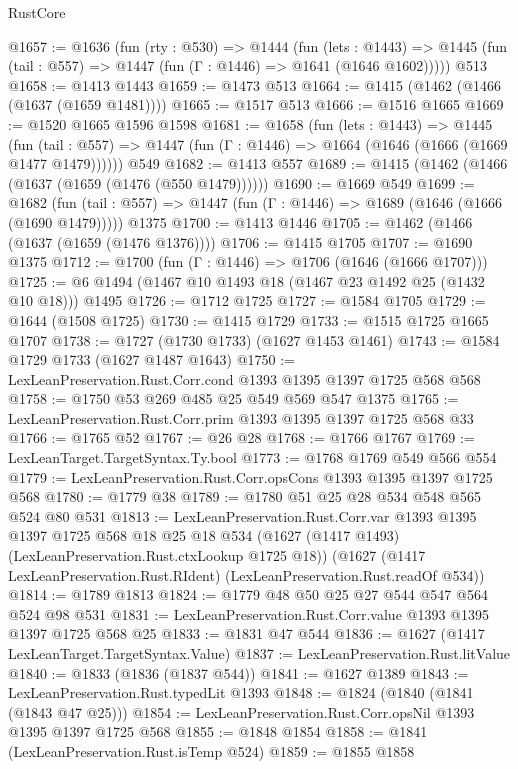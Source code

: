 \begin{lexlean}{RustCore}
\begin{coremodule}
@1657 := @1636
    (fun (rty : @530) =>
    @1444
      (fun (lets : @1443) =>
      @1445 (fun (tail : @557) => @1447 (fun (Γ : @1446) => @1641 (@1646 @1602)))))
    @513
@1658 := @1413 @1443
@1659 := @1473 @513
@1664 := @1415 (@1462 (@1466 (@1637 (@1659 @1481))))
@1665 := @1517 @513
@1666 := @1516 @1665
@1669 := @1520 @1665 @1596 @1598
@1681 := @1658
    (fun (lets : @1443) =>
    @1445
      (fun (tail : @557) => @1447 (fun (Γ : @1446) => @1664 (@1646 (@1666 (@1669 @1477 @1479))))))
    @549
@1682 := @1413 @557
@1689 := @1415 (@1462 (@1466 (@1637 (@1659 (@1476 (@550 @1479))))))
@1690 := @1669 @549
@1699 := @1682
    (fun (tail : @557) => @1447 (fun (Γ : @1446) => @1689 (@1646 (@1666 (@1690 @1479)))))
    @1375
@1700 := @1413 @1446
@1705 := @1462 (@1466 (@1637 (@1659 (@1476 @1376))))
@1706 := @1415 @1705
@1707 := @1690 @1375
@1712 := @1700 (fun (Γ : @1446) => @1706 (@1646 (@1666 @1707)))
@1725 := @6 @1494 (@1467 @10 @1493 @18 (@1467 @23 @1492 @25 (@1432 @10 @18))) @1495
@1726 := @1712 @1725
@1727 := @1584 @1705
@1729 := @1644 (@1508 @1725)
@1730 := @1415 @1729
@1733 := @1515 @1725 @1665 @1707
@1738 := @1727 (@1730 @1733) (@1627 @1453 @1461)
@1743 := @1584 @1729 @1733 (@1627 @1487 @1643)
@1750 := LexLeanPreservation.Rust.Corr.cond @1393 @1395 @1397 @1725 @568 @568
@1758 := @1750 @53 @269 @485 @25 @549 @569 @547 @1375
@1765 := LexLeanPreservation.Rust.Corr.prim @1393 @1395 @1397 @1725 @568 @33
@1766 := @1765 @52
@1767 := @26 @28
@1768 := @1766 @1767
@1769 := LexLeanTarget.TargetSyntax.Ty.bool
@1773 := @1768 @1769 @549 @566 @554
@1779 := LexLeanPreservation.Rust.Corr.opsCons @1393 @1395 @1397 @1725 @568
@1780 := @1779 @38
@1789 := @1780 @51 @25 @28 @534 @548 @565 @524 @80 @531
@1813 := LexLeanPreservation.Rust.Corr.var
    @1393
    @1395
    @1397
    @1725
    @568
    @18
    @25
    @18
    @534
    (@1627 (@1417 @1493) (LexLeanPreservation.Rust.ctxLookup @1725 @18))
    (@1627 (@1417 LexLeanPreservation.Rust.RIdent) (LexLeanPreservation.Rust.readOf @534))
@1814 := @1789 @1813
@1824 := @1779 @48 @50 @25 @27 @544 @547 @564 @524 @98 @531
@1831 := LexLeanPreservation.Rust.Corr.value @1393 @1395 @1397 @1725 @568 @25
@1833 := @1831 @47 @544
@1836 := @1627 (@1417 LexLeanTarget.TargetSyntax.Value)
@1837 := LexLeanPreservation.Rust.litValue
@1840 := @1833 (@1836 (@1837 @544))
@1841 := @1627 @1389
@1843 := LexLeanPreservation.Rust.typedLit @1393
@1848 := @1824 (@1840 (@1841 (@1843 @47 @25)))
@1854 := LexLeanPreservation.Rust.Corr.opsNil @1393 @1395 @1397 @1725 @568
@1855 := @1848 @1854
@1858 := @1841 (LexLeanPreservation.Rust.isTemp @524)
@1859 := @1855 @1858

\end{coremodule}
\end{lexlean}

